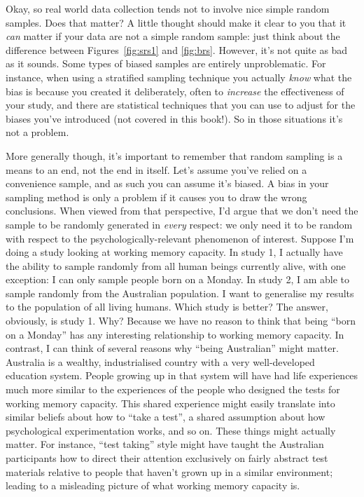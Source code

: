 
Okay, so real world data collection tends not to involve nice simple random samples. Does that matter? A little thought should make it clear to you that it {\it can} matter if your data are not a simple random sample: just think about the difference between Figures~\ref{fig:srs1} and \ref{fig:brs}. However, it's not quite as bad as it sounds. Some types of biased samples are entirely unproblematic. For instance, when using a stratified sampling technique you actually {\it know} what the bias is because you created it deliberately, often to {\it increase} the effectiveness of your study, and there are statistical techniques that you can use to adjust for the biases you've introduced (not covered in this book!). So in those situations it's not a problem. 

More generally though, it's important to remember that random sampling is a means to an end, not the end in itself. Let's assume you've relied on a convenience sample, and as such you can assume it's biased. A bias in your sampling method is only a problem if it causes you to draw the wrong conclusions. When viewed from that perspective, I'd argue that we don't need the sample to be randomly generated in {\it every} respect: we only need it to be random with respect to the psychologically-relevant phenomenon of interest. Suppose I'm doing a study looking at working memory capacity. In study 1, I actually have the ability to sample randomly from all human beings currently alive, with one exception: I can only sample people born on a Monday. In study 2, I am able to sample randomly from the Australian population. I want to generalise my results to the population of all living humans. Which study is better? The answer, obviously, is study 1. Why? Because we have no reason to think that being ``born on a Monday'' has any interesting relationship to working memory capacity. In contrast, I can think of several reasons why ``being Australian'' might matter. Australia is a wealthy, industrialised country with a very well-developed education system. People growing up in that system will have had life experiences much more similar to the experiences of the people who designed the tests for working memory capacity. This shared experience might easily translate into similar beliefs about how to ``take a test'', a shared assumption about how psychological experimentation works, and so on. These things might actually matter. For instance, ``test taking'' style might have taught the Australian participants how to direct their attention exclusively on fairly abstract test materials relative to people that haven't grown up in a similar environment; leading to a misleading picture of what working memory capacity is. 

